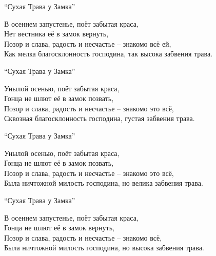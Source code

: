 \begin{ver}[1]
\begin{verses}
  \centerline{``Сухая Трава у Замка''}
  В осеннем запустенье, поёт забытая краса,\\
  Нет вестника её в замок вернуть,\\
  Позор и слава, радость и несчастье -- знакомо всё ей,\\
  Как мелка благосклонность господина, так высока забвения трава.\\
\end{verses}
\end{ver}

\begin{ver}[1]
\begin{verses}
  \centerline{``Сухая Трава у Замка''}
  Унылой осенью, поёт забытая краса,\\
  Гонца не шлют её в замок позвать,\\
  Позор и слава, радость и несчастье -- знакомо это всё,\\
  Сквозная благосклонность господина, густая забвения трава.\\
\end{verses}
\end{ver}

\begin{ver}[1]
\begin{verses}
  \centerline{``Сухая Трава у Замка''}
  Унылой осенью, поёт забытая краса,\\
  Гонца не шлют её в замок позвать,\\
  Позор и слава, радость и несчастье -- знакомо это всё,\\
  Была ничтожной милость господина, но велика забвения трава.\\
\end{verses}
\end{ver}

\begin{ver}[1]
\begin{verses}
  \centerline{``Сухая Трава у Замка''}
  В осеннем запустенье, поёт забытая краса,\\
  Гонца не шлют её в замок вернуть,\\
  Позор и слава, радость и несчастье -- знакомо всё,\\
  Была ничтожной милость господина, но высока забвения трава.\\
\end{verses}
\end{ver}

